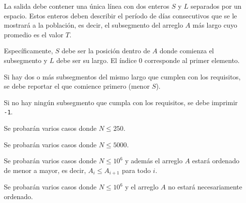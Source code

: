 \documentclass{oci}
\begin{document}
\begin{outputDescription}
La salida debe contener una única línea con dos enteros $S$ y $L$ separados por
un espacio.
Estos enteros deben describir el período de días consecutivos que se le mostrará
a la población, es decir, el subsegmento del arreglo $A$ más largo cuyo
promedio es el valor $T$.

Específicamente, $S$ debe ser la posición dentro de $A$ donde comienza el
subsegmento y $L$ debe ser su largo.
El índice $0$ corresponde al primer elemento.
 
Si hay dos o más subsegmentos del mismo largo que cumplen con los requisitos, se
debe reportar el que comience primero (menor $S$).

Si no hay ningún subsegmento que cumpla con los requisitos, se debe imprimir
\texttt{-1}.
\end{outputDescription}

\begin{scoreDescription}
  Se probarán varios casos donde $N \le 250$.
 
  Se probarán varios casos donde $N \le 5000$.
 
  Se probarán varios casos donde $N \le 10^6$ y además el arreglo $A$ estará ordenado de
  menor a mayor, es decir, $A_i \le A_{i+1}$ para todo $i$.
 
  Se probarán varios casos donde $N \le 10^6$ y el arreglo $A$ no estará
  necesariamente ordenado.
\end{scoreDescription}

\begin{sampleDescription}
\end{sampleDescription}
\end{document}
